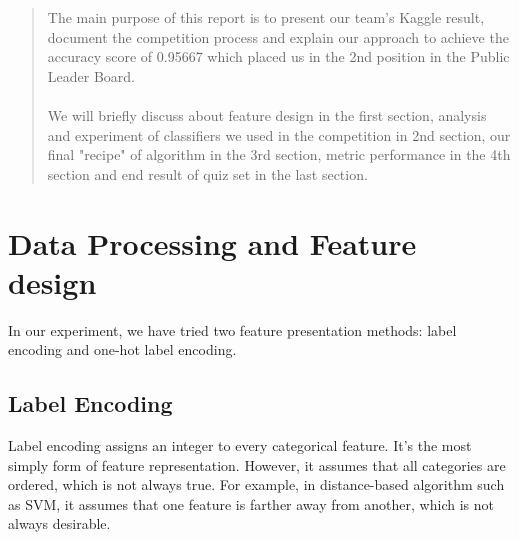 \documentclass[conference]{IEEEtran}
\begin{document}




\maketitle

\begin{abstract}
The main purpose of this report is to present our team's Kaggle result, document the competition process and explain our approach to achieve the accuracy score of 0.95667 which placed us in the 2nd position in the Public Leader Board.
\\ \\
We will briefly discuss about feature design in the first section, analysis and experiment of classifiers we used in the competition in 2nd section, our final "recipe" of algorithm in the 3rd section, metric performance in the 4th section and end result of quiz set in the last section.
\end{abstract}

\bigskip
%
\IEEEpeerreviewmaketitle

\section{Data Processing and Feature design}
In our experiment, we have tried two feature presentation methods: label encoding and one-hot label encoding.

\subsection{Label Encoding}
Label encoding assigns an integer to every categorical feature. It's the most simply form of feature representation. However, it assumes that all categories are ordered, which is not always true. For example, in distance-based algorithm such as SVM, it assumes that one feature is farther away from another, which is not always desirable. 
\end{document}
